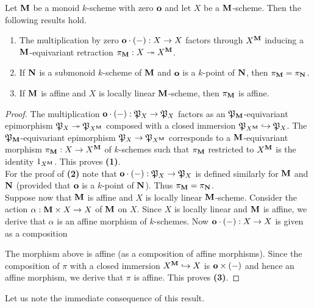 \begin{proposition}\label{proposition:retraction_for_monoids_with_zero}
Let $\mathbf{M}$ be a monoid $k$-scheme with zero $\mathbf{o}$ and let $X$ be a $\mathbf{M}$-scheme. Then the following results hold.
\begin{enumerate}[label=\emph{\textbf{(\arabic*)}}, leftmargin=3.0em]
\item The multiplication by zero $\mathbf{o}\cdot(-):X\rightarrow X$ factors through $X^{\mathbf{M}}$ inducing a $\mathbf{M}$-equivariant retraction $\pi_{\mathbf{M}}:X\twoheadrightarrow X^{\mathbf{M}}$.
\item If $\mathbf{N}$ is a submonoid $k$-scheme of $\mathbf{M}$ and $\mathbf{o}$ is a $k$-point of $\mathbf{N}$, then $\pi_{\mathbf{M}} = \pi_{\mathbf{N}}$.
\item If $\mathbf{M}$ is affine and $X$ is locally linear $\mathbf{M}$-scheme, then $\pi_{\mathbf{M}}$ is affine.
\end{enumerate}
\end{proposition}
\begin{proof}
The multiplication $\mathbf{o}\cdot (-):{\mathfrak P}_X\rightarrow {\mathfrak P}_X$ factors as an ${\mathfrak P}_{\mathbf{M}}$-equivariant epimorphism ${\mathfrak P}_X\twoheadrightarrow {\mathfrak P}_{X^{\mathbf{M}}}$ composed with a closed immersion ${\mathfrak P}_{X^{\mathbf{M}}}\hookrightarrow {\mathfrak P}_X$. The ${\mathfrak P}_{\mathbf{M}}$-equivariant epimorphism ${\mathfrak P}_X\rightarrow {\mathfrak P}_{X^{\mathbf{M}}}$ corresponds to a $\mathbf{M}$-equivariant morphism $\pi_{\mathbf{M}}:X\rightarrow X^{\mathbf{M}}$ of $k$-schemes such that $\pi_{\mathbf{M}}$ restricted to $X^{\mathbf{M}}$ is the identity $1_{X^{\mathbf{M}}}$. This proves \textbf{(1)}.\\
For the proof of \textbf{(2)} note that $\mathbf{o}\cdot (-):{\mathfrak P}_X\rightarrow {\mathfrak P}_X$ is defined similarly for $\mathbf{M}$ and $\mathbf{N}$ (provided that $\mathbf{o}$ is a $k$-point of $\mathbf{N}$). Thus $\pi_{\mathbf{M}} = \pi_{\mathbf{N}}$.\\
Suppose now that $\mathbf{M}$ is affine and $X$ is locally linear $\mathbf{M}$-scheme. Consider the action $\alpha:\mathbf{M}\times X\rightarrow X$ of $\mathbf{M}$ on $X$. Since $X$ is locally linear and $\mathbf{M}$ is affine, we derive that $\alpha$ is an affine morphism of $k$-schemes. Now $\mathbf{o}\cdot (-):X\rightarrow X$ is given as a composition 
\begin{center}
\end{center}
The morphism above is affine (as a composition of affine morphisms). Since the composition of $\pi$ with a closed immersion $X^{\mathbf{M}}\hookrightarrow X$ is $\mathbf{o}\times(-)$ and hence an affine morphism, we derive that $\pi$ is affine. This proves \textbf{(3)}.
\end{proof}
\noindent
Let us note the immediate consequence of this result.

